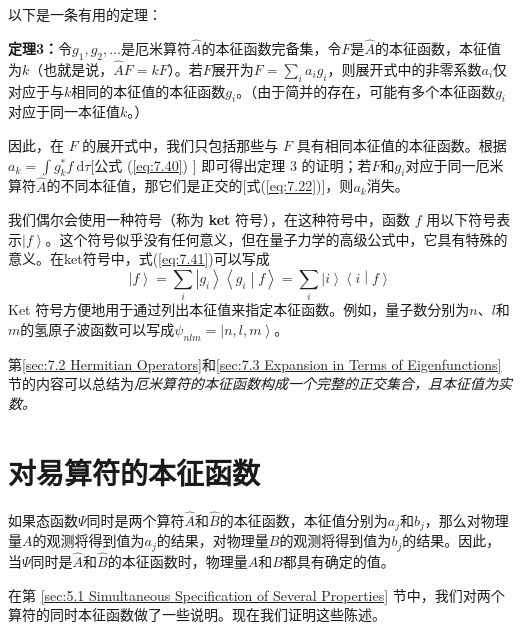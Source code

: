     以下是一条有用的定理：
    \begin{center}
        \parbox{0.8\textwidth}{
            \textbf{定理3：}令$g_1,g_2,\ldots$是厄米算符$\hat{A}$的本征函数完备集，令$F$是$\hat{A}$的本征函数，本征值为$k$（也就是说，$\hat{A}F = kF$）。若$F$展开为$F = \sum_{i}a_ig_i$，则展开式中的非零系数$a_i$仅对应于与$k$相同的本征值的本征函数$g_i$。（由于简并的存在，可能有多个本征函数$g_i$对应于同一本征值$k$。）
            
        }
    \end{center}

    因此，在 $F$ 的展开式中，我们只包括那些与 $F$ 具有相同本征值的本征函数。根据 $a_k = \int g_k^{\ast} f \:\mathrm{d}\tau$[公式 (\ref{eq:7.40}) ] 即可得出定理 3 的证明；若$F$和$g_i$对应于同一厄米算符$\hat{A}$的不同本征值，那它们是正交的[式(\ref{eq:7.22})]，则$a_k$消失。

    我们偶尔会使用一种符号（称为 \textbf{ket} 符号），在这种符号中，函数 $f$ 用以下符号表示$\left| f \right\rangle$。这个符号似乎没有任何意义，但在量子力学的高级公式中，它具有特殊的意义。在ket符号中，式(\ref{eq:7.41})可以写成
    \begin{equation}
        \left| f \right\rangle = \sum_{i} \left| g_i\right\rangle \left\langle g_i \middle| f \right\rangle = \sum_i \left| i \right\rangle \left\langle i \middle| f \right\rangle
        \label{eq:7.42}
    \end{equation}
    Ket 符号方便地用于通过列出本征值来指定本征函数。例如，量子数分别为$n$、$l$和$m$的氢原子波函数可以写成$\psi_{nlm} = \left| n,l,m \right\rangle$。

    第\ref{sec:7.2 Hermitian Operators}和\ref{sec:7.3 Expansion in Terms of Eigenfunctions}节的内容可以总结为\textit{厄米算符的本征函数构成一个完整的正交集合，且本征值为实数。}

\section{对易算符的本征函数}
\label{sec:7.4 Eigenfunctions of Commuting Operators}
    如果态函数$\Psi$同时是两个算符$\hat{A}$和$\hat{B}$的本征函数，本征值分别为$a_j$和$b_j$，那么对物理量$A$的观测将得到值为$a_j$的结果，对物理量$B$的观测将得到值为$b_j$的结果。因此，当$\Psi$同时是$\hat{A}$和$\hat{B}$的本征函数时，物理量$A$和$B$都具有确定的值。

    在第 \ref{sec:5.1 Simultaneous Specification of Several Properties} 节中，我们对两个算符的同时本征函数做了一些说明。现在我们证明这些陈述。

